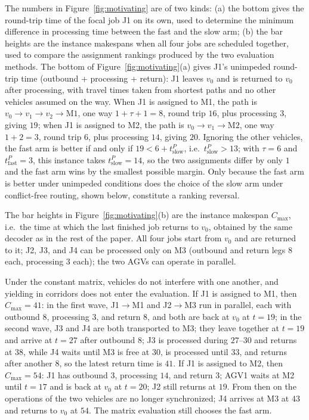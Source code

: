 The numbers in Figure~\ref{fig:motivating} are of two kinds: (a) the bottom gives the round-trip time of the focal job J1 on its own, used to determine the minimum difference in processing time between the fast and the slow arm; (b) the bar heights are the instance makespans when all four jobs are scheduled together, used to compare the assignment rankings produced by the two evaluation methods.
The bottom of Figure~\ref{fig:motivating}(a) gives J1's unimpeded round-trip time (outbound + processing + return): J1 leaves $v_0$ and is returned to $v_0$ after processing, with travel times taken from shortest paths and no other vehicles assumed on the way.
When J1 is assigned to M1, the path is $v_0\to v_1\to v_2\to\mathrm{M1}$, one way $1+\tau+1=8$, round trip $16$, plus processing $3$, giving $19$;
when J1 is assigned to M2, the path is $v_0\to v_1\to\mathrm{M2}$, one way $1+2=3$, round trip $6$, plus processing $14$, giving $20$.
Ignoring the other vehicles, the fast arm is better if and only if $19<6+t^P_{\text{slow}}$, i.e.\ $t^P_{\text{slow}}>13$; with $\tau=6$ and $t^P_{\text{fast}}=3$, this instance takes $t^P_{\text{slow}}=14$, so the two assignments differ by only $1$ and the fast arm wins by the smallest possible margin.
Only because the fast arm is better under unimpeded conditions does the choice of the slow arm under conflict-free routing, shown below, constitute a ranking reversal.

The bar heights in Figure~\ref{fig:motivating}(b) are the instance makespan $C_{\max}$, i.e.\ the time at which the last finished job returns to $v_0$, obtained by the same decoder as in the rest of the paper.
All four jobs start from $v_0$ and are returned to it; J2, J3, and J4 can be processed only on M3 (outbound and return legs $8$ each, processing $3$ each); the two AGVs can operate in parallel.

Under the constant matrix, vehicles do not interfere with one another, and yielding in corridors does not enter the evaluation.
If J1 is assigned to M1, then $C_{\max}=41$: in the first wave, J1$\to$M1 and J2$\to$M3 run in parallel, each with outbound $8$, processing $3$, and return $8$, and both are back at $v_0$ at $t=19$;
in the second wave, J3 and J4 are both transported to M3; they leave together at $t=19$ and arrive at $t=27$ after outbound $8$; J3 is processed during $27$--$30$ and returns at $38$, while J4 waits until M3 is free at $30$, is processed until $33$, and returns after another $8$, so the latest return time is $41$.
If J1 is assigned to M2, then $C_{\max}=54$: J1 has outbound $3$, processing $14$, and return $3$; AGV1 waits at M2 until $t=17$ and is back at $v_0$ at $t=20$; J2 still returns at $19$.
From then on the operations of the two vehicles are no longer synchronized; J4 arrives at M3 at $43$ and returns to $v_0$ at $54$. The matrix evaluation still chooses the fast arm.


